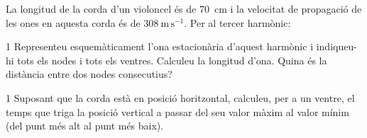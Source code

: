 La longitud de la corda d'un violoncel és de 70~cm i la velocitat de propagació de les ones en aquesta corda és de $308\ \mathrm{m\,s^{-1}}$. Per al tercer harmònic:

\begin{apartat}{1}
Representeu esquemàticament l'ona estacionària d'aquest harmònic i indiqueu-hi tots els nodes i tots els ventres. Calculeu la longitud d'ona. Quina és la distància entre dos nodes consecutius?
\end{apartat}

\begin{apartat}{1}
Suposant que la corda està en posició horitzontal, calculeu, per a un ventre, el temps que triga la posició vertical a passar del seu valor màxim al valor mínim (del punt més alt al punt més baix).
\end{apartat}
